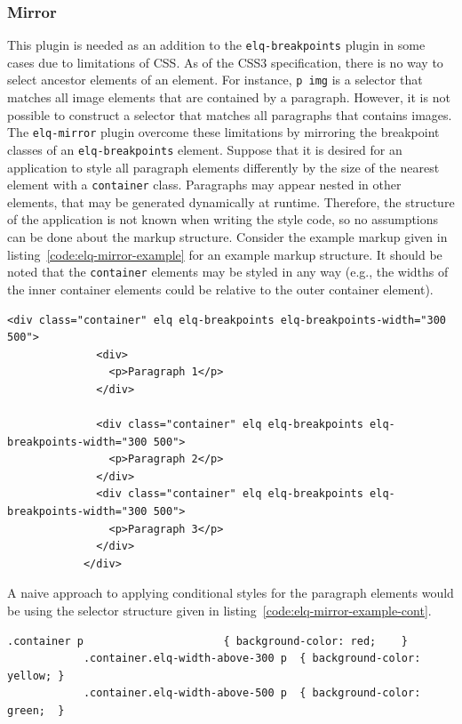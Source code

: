 \documentclass[a4paper,11pt]{kth-mag}
\newcommand{\code}[1]{\texttt{#1}}
\begin{document}
        \subsubsection{Mirror}\label{sec:plugin-mirror}
          This plugin is needed as an addition to the \code{elq-breakpoints} plugin in some cases due to limitations of CSS.
          As of the \gls{CSS3} specification, there is no way to select ancestor elements of an element.
          For instance, \code{p img} is a selector that matches all image elements that are contained by a paragraph.
          However, it is not possible to construct a selector that matches all paragraphs that contains images.
          The \code{elq-mirror} plugin overcome these limitations by mirroring the breakpoint classes of an \code{elq-breakpoints} element.
          Suppose that it is desired for an application to style all paragraph elements differently by the size of the nearest element with a \code{container} class.
          Paragraphs may appear nested in other elements, that may be generated dynamically at runtime.
          Therefore, the structure of the application is not known when writing the style code, so no assumptions can be done about the markup structure.
          Consider the example markup given in listing~\ref{code:elq-mirror-example} for an example markup structure.
          It should be noted that the \code{container} elements may be styled in any way (e.g., the widths of the inner container elements could be relative to the outer container element).
          \begin{lstlisting}[gobble=12,caption={Example markup structure where all paragraphs are desired to be conditionally styled by the nearest ancestor container.},captionpos=b,label={code:elq-mirror-example}]
            <div class="container" elq elq-breakpoints elq-breakpoints-width="300 500">
              <div>
                <p>Paragraph 1</p>
              </div>

              <div class="container" elq elq-breakpoints elq-breakpoints-width="300 500">
                <p>Paragraph 2</p>
              </div>
              <div class="container" elq elq-breakpoints elq-breakpoints-width="300 500">
                <p>Paragraph 3</p>
              </div>
            </div>
          \end{lstlisting}
          A naive approach to applying conditional styles for the paragraph elements would be using the selector structure given in listing~\ref{code:elq-mirror-example-cont}.
          \begin{lstlisting}[gobble=12,caption={A naive approach to styling the paragraphs conditionally.},captionpos=b,label={code:elq-mirror-example-cont}]
            .container p                      { background-color: red;    }
            .container.elq-width-above-300 p  { background-color: yellow; }
            .container.elq-width-above-500 p  { background-color: green;  }
          \end{lstlisting}
\end{document}
